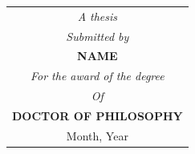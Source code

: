 \begin{titlepage}
\begin{tabular}{c}
     
     
     \vspace{-0.25cm}\textit{A thesis}\\
     \vspace{-0.25cm}\textit{Submitted by}\\
     \vspace{2cm}
     \textbf{NAME}\\
     
     
     \vspace{-0.25cm}\textit{For the award of the degree}\\
     \vspace{-0.25cm}\textit{Of}\\
     \vspace{-0.25cm}\textbf{DOCTOR OF PHILOSOPHY}\\
     Month, Year
    
\end{tabular}\\

\end{titlepage}